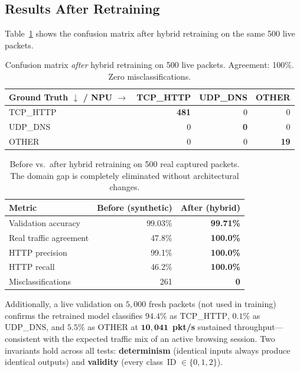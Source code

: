 \documentclass[11pt,a4paper,twoside]{article}
\theoremstyle{definition}
\theoremstyle{remark}
\begin{document}
\subsection{Results After Retraining}

Table~\ref{tab:confusion-after} shows the confusion matrix after hybrid retraining on the same 500 live packets.

\begin{table}[H]
\centering
\small
\begin{tabular}{l|rrr}
\toprule
\textbf{Ground Truth $\downarrow$ / NPU $\to$} & \textbf{TCP\_HTTP} & \textbf{UDP\_DNS} & \textbf{OTHER} \\
\midrule
TCP\_HTTP & \textbf{481} & 0 & 0 \\
UDP\_DNS  & 0   & \textbf{0} & 0 \\
OTHER     & 0   & 0   & \textbf{19} \\
\bottomrule
\end{tabular}
\caption{Confusion matrix \emph{after} hybrid retraining on 500 live packets. Agreement: 100\%. Zero misclassifications.}
\label{tab:confusion-after}
\end{table}

\begin{table}[H]
\centering
\small
\begin{tabular}{lrr}
\toprule
\textbf{Metric} & \textbf{Before (synthetic)} & \textbf{After (hybrid)} \\
\midrule
Validation accuracy   & 99.03\% & \textbf{99.71\%} \\
Real traffic agreement & 47.8\% & \textbf{100.0\%} \\
HTTP precision         & 99.1\% & \textbf{100.0\%} \\
HTTP recall            & 46.2\% & \textbf{100.0\%} \\
Misclassifications     & 261    & \textbf{0} \\
\bottomrule
\end{tabular}
\caption{Before vs.\ after hybrid retraining on 500 real captured packets. The domain gap is completely eliminated without architectural changes.}
\label{tab:retrain-comparison}
\end{table}

\noindent Additionally, a live validation on $5{,}000$ fresh packets (not used in training) confirms the retrained model classifies $94.4\%$ as \textsc{TCP\_HTTP}, $0.1\%$ as \textsc{UDP\_DNS}, and $5.5\%$ as \textsc{OTHER} at $\mathbf{10{,}041}$~\textbf{pkt/s} sustained throughput---consistent with the expected traffic mix of an active browsing session. Two invariants hold across all tests: \textbf{determinism} (identical inputs always produce identical outputs) and \textbf{validity} (every class~ID $\in \{0, 1, 2\}$).
\end{document}
